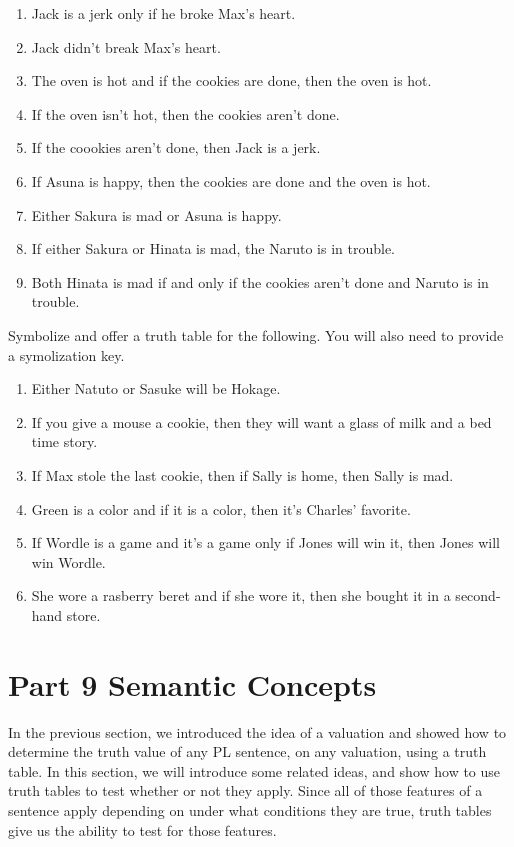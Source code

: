 \begin{enumerate}
\item Jack is a jerk only if he broke Max's heart.
\item Jack didn't break Max's heart.
\item The oven is hot and if the cookies are done, then the oven is hot.
\item If the oven isn't hot, then the cookies aren't done.
\item If the coookies aren't done, then Jack is a jerk.
\item If Asuna is happy, then the cookies are done and the oven is hot.
\item Either Sakura is mad or Asuna is happy.
\item If either Sakura or Hinata is mad, the Naruto is in trouble.
\item Both Hinata is mad if and only if the cookies aren't done and Naruto is in trouble.  
\end{enumerate}
\problempart
Symbolize and offer a truth table for the following. You will also need to provide a symolization key.
\begin{enumerate}
\item Either Natuto or Sasuke will be Hokage.
\item If you give a mouse a cookie, then they will want a glass of milk and a bed time story.
\item If Max stole the last cookie, then if Sally is home, then Sally is mad.
\item Green is a color and if it is a color, then it's Charles' favorite.
\item If Wordle is a game and it's a game only if Jones will win it, then Jones will win Wordle.
\item She wore a rasberry beret and if she wore it, then she bought it in a second-hand store. 
\end{enumerate}



\chapter{Part 9 Semantic Concepts}
In the previous section, we introduced the idea of a valuation and showed how to determine the truth value of any PL sentence, on any valuation, using a truth table. In this section, we will introduce some related ideas, and show how to use truth tables to test whether or not they apply. Since all of those features of a sentence apply depending on under what conditions they are true, truth tables give us the ability to test for those features. 

